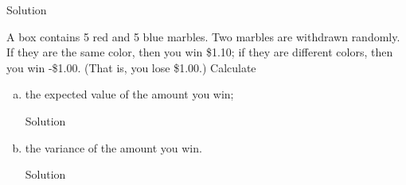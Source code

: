 \documentclass{article}
\begin{document}
\begin{spacing}{1.1}
\begin{homeworkProblem}
\begin{enumerate}[(a)]
\begin{homeworkSection}{Solution}
      \end{homeworkSection}
  \end{enumerate}
\end{homeworkProblem}
\newpage
\begin{homeworkProblem}

  A box contains 5 red and 5 blue marbles. Two marbles are withdrawn 
  randomly. If they are the same color, then you win \$1.10; if they 
  are different colors, then you win -\$1.00. (That is, you lose \$1.00.) 
  Calculate


  \begin{enumerate}[(a)]
    \item the expected value of the amount you win;
      \begin{homeworkSection}{Solution}

      \end{homeworkSection}
    \item the variance of the amount you win.
      \begin{homeworkSection}{Solution}

      \end{homeworkSection}
  \end{enumerate}

\end{homeworkProblem}
\end{spacing}
\end{document}
